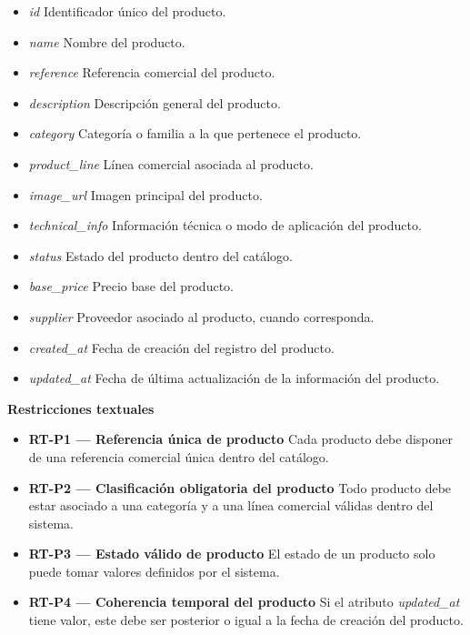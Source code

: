 \begin{itemize}
      \item \textit{id}
            Identificador único del producto.
      \item \textit{name}
            Nombre del producto.
      \item \textit{reference}
            Referencia comercial del producto.
      \item \textit{description}
            Descripción general del producto.
      \item \textit{category}
            Categoría o familia a la que pertenece el producto.
      \item \textit{product\_line}
            Línea comercial asociada al producto.
      \item \textit{image\_url}
            Imagen principal del producto.
      \item \textit{technical\_info}
            Información técnica o modo de aplicación del producto.
      \item \textit{status}
            Estado del producto dentro del catálogo.
      \item \textit{base\_price}
            Precio base del producto.
      \item \textit{supplier}
            Proveedor asociado al producto, cuando corresponda.
      \item \textit{created\_at}
            Fecha de creación del registro del producto.
      \item \textit{updated\_at}
            Fecha de última actualización de la información del producto.
\end{itemize}

\textbf{Restricciones textuales}

\begin{itemize}
      \item \textbf{RT-P1 — Referencia única de producto}
            Cada producto debe disponer de una referencia comercial única dentro del catálogo.
      \item \textbf{RT-P2 — Clasificación obligatoria del producto}
            Todo producto debe estar asociado a una categoría y a una línea comercial válidas dentro del sistema.
      \item \textbf{RT-P3 — Estado válido de producto}
            El estado de un producto solo puede tomar valores definidos por el sistema.
      \item \textbf{RT-P4 — Coherencia temporal del producto}
            Si el atributo \textit{updated\_at} tiene valor, este debe ser posterior o igual a la fecha de creación del producto.
\end{itemize}

